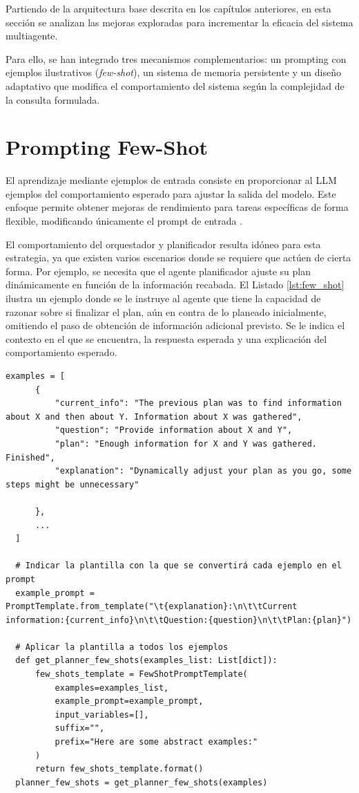 Partiendo de la arquitectura base descrita en los capítulos anteriores, en esta sección se analizan las mejoras exploradas para incrementar la eficacia del sistema multiagente.

Para ello, se han integrado tres mecanismos complementarios: un prompting con ejemplos ilustrativos (\textit{few-shot}), un sistema de memoria persistente y un diseño adaptativo que modifica el comportamiento del sistema según la complejidad de la consulta formulada.

\section{Prompting Few-Shot}
El aprendizaje mediante ejemplos de entrada consiste en proporcionar al LLM ejemplos del comportamiento esperado para ajustar la salida del modelo. Este enfoque permite obtener mejoras de rendimiento para tareas específicas de forma flexible, modificando únicamente el prompt de entrada \cite{brown_language_2020}.

El comportamiento del orquestador y planificador resulta idóneo para esta estrategia, ya que existen varios escenarios donde se requiere que actúen de cierta forma. Por ejemplo, se necesita que el agente planificador ajuste su plan dinámicamente en función de la información recabada. El Listado \ref{lst:few_shot} ilustra un ejemplo donde se le instruye al agente que tiene la capacidad de razonar sobre si finalizar el plan, aún en contra de lo planeado inicialmente, omitiendo el paso de obtención de información adicional previsto. Se le indica el contexto en el que se encuentra, la respuesta esperada y una explicación del comportamiento esperado.

\begin{lstlisting}[caption={Integración de ejemplos few-shot al agente planificador},label={lst:few_shot}]
  examples = [
      {
          "current_info": "The previous plan was to find information about X and then about Y. Information about X was gathered",
          "question": "Provide information about X and Y",
          "plan": "Enough information for X and Y was gathered. Finished",
          "explanation": "Dynamically adjust your plan as you go, some steps might be unnecessary"

      },
      ...
  ]

  # Indicar la plantilla con la que se convertirá cada ejemplo en el prompt
  example_prompt = PromptTemplate.from_template("\t{explanation}:\n\t\tCurrent information:{current_info}\n\t\tQuestion:{question}\n\t\tPlan:{plan}")

  # Aplicar la plantilla a todos los ejemplos
  def get_planner_few_shots(examples_list: List[dict]):
      few_shots_template = FewShotPromptTemplate(
          examples=examples_list,
          example_prompt=example_prompt,
          input_variables=[],
          suffix="",
          prefix="Here are some abstract examples:"
      )
      return few_shots_template.format()
  planner_few_shots = get_planner_few_shots(examples)
\end{lstlisting}

